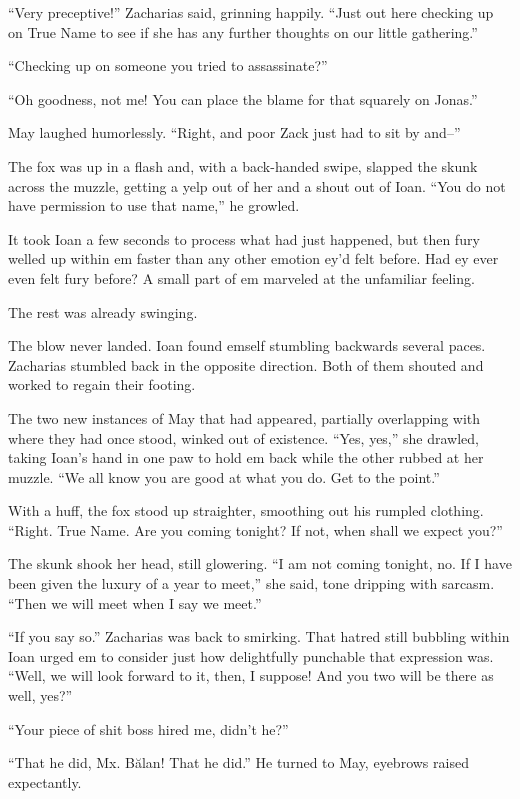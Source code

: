 ``Very preceptive!'' Zacharias said, grinning happily. ``Just out here checking up on True Name to see if she has any further thoughts on our little gathering.''

``Checking up on someone you tried to assassinate?''

``Oh goodness, not me! You can place the blame for that squarely on Jonas.''

May laughed humorlessly. ``Right, and poor Zack just had to sit by and--''

The fox was up in a flash and, with a back-handed swipe, slapped the skunk across the muzzle, getting a yelp out of her and a shout out of Ioan. ``You do not have permission to use that name,'' he growled.

It took Ioan a few seconds to process what had just happened, but then fury welled up within em faster than any other emotion ey'd felt before. Had ey ever even felt fury before? A small part of em marveled at the unfamiliar feeling.

The rest was already swinging.

The blow never landed. Ioan found emself stumbling backwards several paces. Zacharias stumbled back in the opposite direction. Both of them shouted and worked to regain their footing.

The two new instances of May that had appeared, partially overlapping with where they had once stood, winked out of existence. ``Yes, yes,'' she drawled, taking Ioan's hand in one paw to hold em back while the other rubbed at her muzzle. ``We all know you are good at what you do. Get to the point.''

With a huff, the fox stood up straighter, smoothing out his rumpled clothing. ``Right. True Name. Are you coming tonight? If not, when shall we expect you?''

The skunk shook her head, still glowering. ``I am not coming tonight, no. If I have been given the luxury of a year to meet,'' she said, tone dripping with sarcasm. ``Then we will meet when I say we meet.''

``If you say so.'' Zacharias was back to smirking. That hatred still bubbling within Ioan urged em to consider just how delightfully punchable that expression was. ``Well, we will look forward to it, then, I suppose! And you two will be there as well, yes?''

``Your piece of shit boss hired me, didn't he?''

``That he did, Mx. Bălan! That he did.'' He turned to May, eyebrows raised expectantly.

